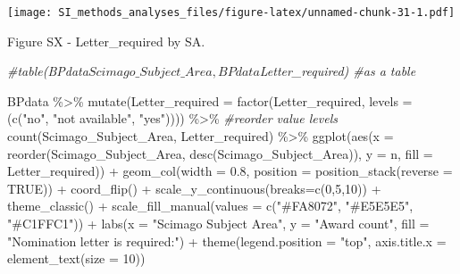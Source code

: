 \documentclass[
]{article}
\newenvironment{Shaded}{\begin{snugshade}}{\end{snugshade}}
\newcommand{\AttributeTok}[1]{\textcolor[rgb]{0.77,0.63,0.00}{#1}}
\newcommand{\CommentTok}[1]{\textcolor[rgb]{0.56,0.35,0.01}{\textit{#1}}}
\newcommand{\ConstantTok}[1]{\textcolor[rgb]{0.00,0.00,0.00}{#1}}
\newcommand{\DecValTok}[1]{\textcolor[rgb]{0.00,0.00,0.81}{#1}}
\newcommand{\FloatTok}[1]{\textcolor[rgb]{0.00,0.00,0.81}{#1}}
\newcommand{\FunctionTok}[1]{\textcolor[rgb]{0.00,0.00,0.00}{#1}}
\newcommand{\NormalTok}[1]{#1}
\newcommand{\SpecialCharTok}[1]{\textcolor[rgb]{0.00,0.00,0.00}{#1}}
\newcommand{\StringTok}[1]{\textcolor[rgb]{0.31,0.60,0.02}{#1}}
\begin{document}
\texttt{[image: SI\_methods\_analyses\_files/figure-latex/unnamed-chunk-31-1.pdf]}

Figure SX - Letter\_required by SA.

\begin{Shaded}
\begin{Highlighting}[]
\CommentTok{\#table(BPdata$Scimago\_Subject\_Area, BPdata$Letter\_required) \#as a table}

\NormalTok{BPdata }\SpecialCharTok{\%\textgreater{}\%} 
    \FunctionTok{mutate}\NormalTok{(}\AttributeTok{Letter\_required =} \FunctionTok{factor}\NormalTok{(Letter\_required, }\AttributeTok{levels =}\NormalTok{ (}\FunctionTok{c}\NormalTok{(}\StringTok{"no"}\NormalTok{, }\StringTok{"not available"}\NormalTok{, }\StringTok{"yes"}\NormalTok{)))) }\SpecialCharTok{\%\textgreater{}\%} \CommentTok{\#reorder value levels}
    \FunctionTok{count}\NormalTok{(Scimago\_Subject\_Area, Letter\_required) }\SpecialCharTok{\%\textgreater{}\%}
    \FunctionTok{ggplot}\NormalTok{(}\FunctionTok{aes}\NormalTok{(}\AttributeTok{x =} \FunctionTok{reorder}\NormalTok{(Scimago\_Subject\_Area, }\FunctionTok{desc}\NormalTok{(Scimago\_Subject\_Area)), }\AttributeTok{y =}\NormalTok{ n, }\AttributeTok{fill =}\NormalTok{ Letter\_required)) }\SpecialCharTok{+} 
    \FunctionTok{geom\_col}\NormalTok{(}\AttributeTok{width =} \FloatTok{0.8}\NormalTok{, }\AttributeTok{position =} \FunctionTok{position\_stack}\NormalTok{(}\AttributeTok{reverse =} \ConstantTok{TRUE}\NormalTok{)) }\SpecialCharTok{+}
    \FunctionTok{coord\_flip}\NormalTok{() }\SpecialCharTok{+}
    \FunctionTok{scale\_y\_continuous}\NormalTok{(}\AttributeTok{breaks=}\FunctionTok{c}\NormalTok{(}\DecValTok{0}\NormalTok{,}\DecValTok{5}\NormalTok{,}\DecValTok{10}\NormalTok{)) }\SpecialCharTok{+}
    \FunctionTok{theme\_classic}\NormalTok{() }\SpecialCharTok{+} 
    \FunctionTok{scale\_fill\_manual}\NormalTok{(}\AttributeTok{values =} \FunctionTok{c}\NormalTok{(}\StringTok{"\#FA8072"}\NormalTok{, }\StringTok{"\#E5E5E5"}\NormalTok{, }\StringTok{"\#C1FFC1"}\NormalTok{)) }\SpecialCharTok{+}
    \FunctionTok{labs}\NormalTok{(}\AttributeTok{x =} \StringTok{"Scimago Subject Area"}\NormalTok{, }\AttributeTok{y =} \StringTok{"Award count"}\NormalTok{, }\AttributeTok{fill =} \StringTok{"Nomination letter is required:"}\NormalTok{) }\SpecialCharTok{+} 
    \FunctionTok{theme}\NormalTok{(}\AttributeTok{legend.position =} \StringTok{"top"}\NormalTok{, }\AttributeTok{axis.title.x =} \FunctionTok{element\_text}\NormalTok{(}\AttributeTok{size =} \DecValTok{10}\NormalTok{))}
\end{Highlighting}
\end{Shaded}
\end{document}
